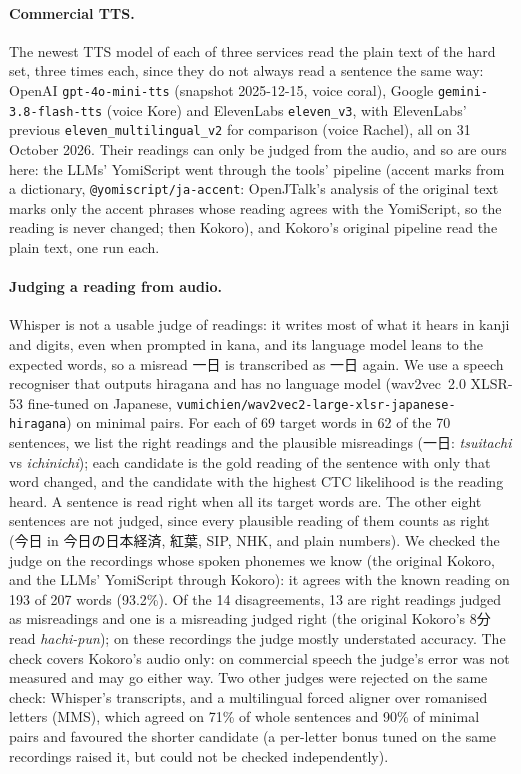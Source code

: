 \documentclass[11pt,a4paper]{article}
\begin{document}
\paragraph{Commercial TTS.} The newest TTS model of each of three services read the plain text of the hard set, three
times each, since they do not always read a sentence the same way: OpenAI \texttt{gpt-4o-mini-tts} (snapshot
2025-12-15, voice coral), Google \texttt{gemini-3.8-flash-tts} (voice Kore) and ElevenLabs \texttt{eleven\_v3}, with
ElevenLabs' previous \texttt{eleven\_multilingual\_v2} for comparison (voice Rachel), all on 31 October 2026. Their
readings can only be judged from the audio, and so are ours here: the LLMs' YomiScript went through the tools' pipeline
(accent marks from a dictionary, \texttt{@yomiscript/ja-accent}: OpenJTalk's analysis of the original text marks only
the accent phrases whose reading agrees with the YomiScript, so the reading is never changed; then Kokoro), and
Kokoro's original pipeline read the plain text, one run each.

\paragraph{Judging a reading from audio.} Whisper is not a usable judge of readings: it writes most of what it hears in
kanji and digits, even when prompted in kana, and its language model leans to the expected words, so a misread 一日
is transcribed as 一日 again. We use a speech recogniser that outputs hiragana and has no language model (wav2vec~2.0
XLSR-53 fine-tuned on Japanese, \texttt{vumichien/wav2vec2-large-xlsr-japanese-hiragana}) on minimal pairs. For each
of 69 target words in 62 of the 70 sentences, we list the right readings and the plausible misreadings (一日:
\emph{tsuitachi} vs \emph{ichinichi}); each candidate is the gold reading of the sentence with only that word changed,
and the candidate with the highest CTC likelihood is the reading heard. A sentence is read right when all its target
words are. The other eight sentences are not judged, since every plausible reading of them counts as right (今日 in
今日の日本経済, 紅葉, SIP, NHK, and plain numbers). We checked the judge on the recordings whose spoken phonemes we
know (the original Kokoro, and the LLMs' YomiScript through Kokoro): it agrees with the known reading on 193 of 207
words (93.2\%). Of the 14 disagreements, 13 are right readings judged as misreadings and one is a misreading judged
right (the original Kokoro's 8分 read \emph{hachi-pun}); on these recordings the judge mostly understated accuracy. The check covers Kokoro's audio only: on commercial speech the judge's
error was not measured and may go either way. Two other judges were rejected on the same check: Whisper's
transcripts, and a multilingual forced aligner over romanised letters (MMS), which agreed on 71\% of whole sentences and 90\% of minimal pairs and favoured the
shorter candidate (a per-letter bonus tuned on the same recordings raised it, but could not be checked independently).
\end{document}
